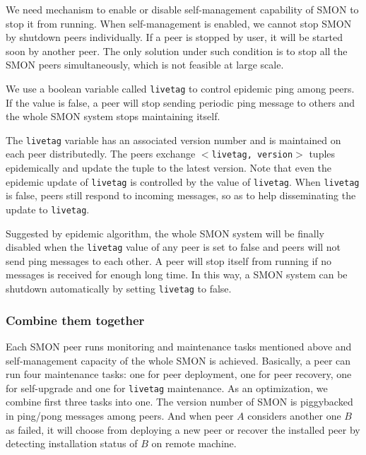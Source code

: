 We need mechanism to enable or disable self-management
capability of SMON to stop it from running. When
self-management is enabled, we cannot stop SMON by shutdown
peers individually.  If a peer is stopped by user, it will
be started soon by another peer. The only solution under
such condition is to stop all the SMON peers simultaneously,
which is not feasible at large scale.

We use a boolean variable called \texttt{livetag} to control epidemic
ping among peers. If the value is false, a peer will
stop sending periodic ping message to others and the whole
SMON system stops maintaining itself. 

The \texttt{livetag} variable has an associated version
number and is maintained on each peer distributedly. The
peers exchange \texttt{$<$livetag, version$>$} tuples
epidemically and update the tuple to the latest version.
Note that even the epidemic update of \texttt{livetag} is
controlled by the value of \texttt{livetag}.  When
\texttt{livetag} is false, peers still respond
to incoming messages, so as to
help disseminating the update to \texttt{livetag}.

Suggested by epidemic algorithm, the whole SMON system will
be finally disabled when the \texttt{livetag} value of any
peer is set to false and peers will not send ping messages
to each other. A peer will stop itself from running if no
messages is received for enough long time. In this way, a
SMON system can be shutdown automatically by setting
\texttt{livetag} to false.

\subsubsection*{Combine them together}

Each SMON peer runs monitoring and maintenance tasks
mentioned above and self-management capacity of the whole
SMON is achieved. Basically, a peer can run four maintenance
tasks: one for peer deployment, one for peer recovery, one
for self-upgrade and one for \texttt{livetag} maintenance.
As an optimization, we combine first three tasks into one.
The version number of SMON is piggybacked in ping/pong
messages among peers. And when peer $A$ considers another
one $B$ as failed, it will choose from deploying a new peer
or recover the installed peer by detecting installation
status of $B$ on remote machine.

% 


